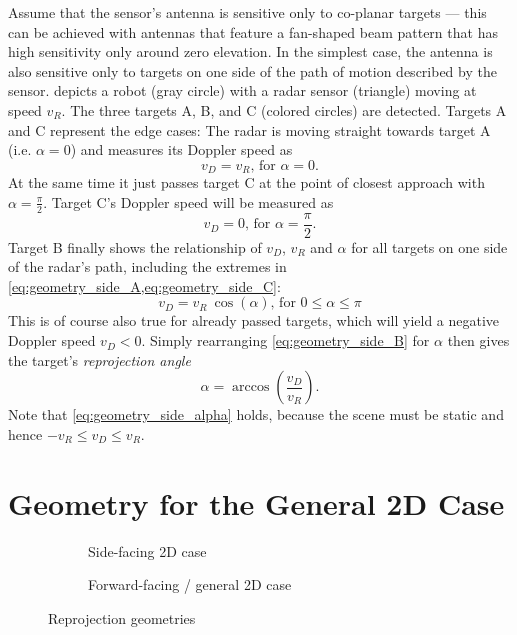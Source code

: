 Assume that the sensor's antenna is sensitive only to co-planar targets --- this can be achieved with antennas that feature a fan-shaped beam pattern that has high sensitivity only around zero elevation. In the simplest case, the antenna is also sensitive only to targets on one side of the path of motion described by the sensor.  depicts a robot (gray circle) with a radar sensor (triangle) moving at speed $v_R$. The three targets A, B, and C (colored circles) are detected. Targets A and C represent the edge cases: The radar is moving straight towards target A (i.e. $\alpha=0$) and measures its Doppler speed as
\begin{equation} \label{eq:geometry_side_A}
    v_D = v_R\text{, for }\alpha=0.
\end{equation}
At the same time it just passes target C at the point of closest approach with $\alpha=\frac{\pi}{2}$. Target C's Doppler speed will be measured as
\begin{equation} \label{eq:geometry_side_C}
    v_D = 0\text{, for }\alpha=\frac{\pi}{2}.
\end{equation}
Target B finally shows the relationship of $v_D$, $v_R$ and $\alpha$ for all targets on one side of the radar's path, including the extremes in \cref{eq:geometry_side_A,eq:geometry_side_C}:
\begin{equation} \label{eq:geometry_side_B}
    v_D = v_R~\cos(\alpha)\text{, for }0 \leq \alpha \leq \pi
\end{equation}
This is of course also true for already passed targets, which will yield a negative Doppler speed $v_D < 0$. Simply rearranging \cref{eq:geometry_side_B} for $\alpha$ then gives the target's \textit{reprojection angle}
\begin{equation} \label{eq:geometry_side_alpha}
    \alpha = \arccos\left(\frac{v_D}{v_R}\right).
\end{equation}
Note that \cref{eq:geometry_side_alpha} holds, because the scene must be static and hence $-v_R \leq v_D \leq v_R$.

\section{Geometry for the General 2D Case} \label{geometry-for-the-general-case}

\begin{figure}[htp]
    \centering
    \footnotesize
    \begin{subfigure}[t]{0.475\textwidth}
        \def\svgwidth{\linewidth}
        
        \caption{Side-facing 2D case}
        \label{fig:geometry-side}
    \end{subfigure}%
    \hfill%
    \begin{subfigure}[t]{0.475\textwidth}
        \def\svgwidth{\linewidth}
        
        \caption{Forward-facing / general 2D case}
        \label{fig:geometry-forward}
    \end{subfigure}
    \caption{Reprojection geometries}
\end{figure}

